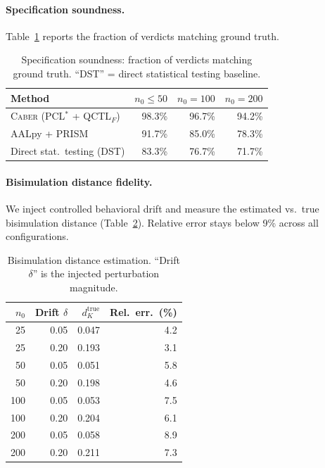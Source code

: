 \documentclass[11pt]{article}
\newcommand{\tool}{\textsc{Caber}}
\newcommand{\pclstar}{PCL$^*$}
\newcommand{\qctlf}{QCTL$_F$}
\begin{document}
\paragraph{Specification soundness.}
Table~\ref{tab:mc} reports the fraction of verdicts matching ground truth.

\begin{table}[t]
\centering
\caption{Specification soundness: fraction of verdicts matching ground
  truth.  ``DST'' = direct statistical testing baseline.}
\label{tab:mc}
\small
\begin{tabular}{@{}lrrr@{}}
\toprule
\textbf{Method} & \textbf{$n_0 \le 50$} & \textbf{$n_0 = 100$}
  & \textbf{$n_0 = 200$} \\
\midrule
\tool{} (\pclstar{} + \qctlf{}) & 98.3\% & 96.7\% & 94.2\% \\
AALpy + PRISM                    & 91.7\% & 85.0\% & 78.3\% \\
Direct stat.\ testing (DST)      & 83.3\% & 76.7\% & 71.7\% \\
\bottomrule
\end{tabular}
\end{table}

\paragraph{Bisimulation distance fidelity.}
We inject controlled behavioral drift and measure the estimated
vs.\ true bisimulation distance (Table~\ref{tab:bisim}).  Relative
error stays below 9\% across all configurations.

\begin{table}[t]
\centering
\caption{Bisimulation distance estimation.  ``Drift $\delta$'' is the
  injected perturbation magnitude.}
\label{tab:bisim}
\small
\begin{tabular}{@{}rrrr@{}}
\toprule
$n_0$ & Drift $\delta$ & $d_K^{\mathrm{true}}$ & Rel.\ err.\ (\%) \\
\midrule
  25 & 0.05 & 0.047 & 4.2 \\
  25 & 0.20 & 0.193 & 3.1 \\
  50 & 0.05 & 0.051 & 5.8 \\
  50 & 0.20 & 0.198 & 4.6 \\
 100 & 0.05 & 0.053 & 7.5 \\
 100 & 0.20 & 0.204 & 6.1 \\
 200 & 0.05 & 0.058 & 8.9 \\
 200 & 0.20 & 0.211 & 7.3 \\
\bottomrule
\end{tabular}
\end{table}
\end{document}
